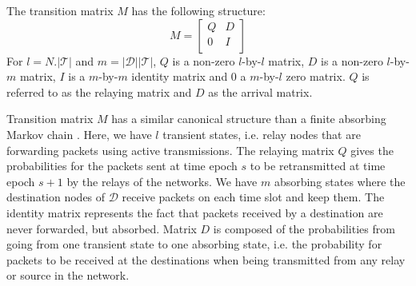 \documentclass[a4paper]{article}
\newcommand{\T}{\mathcal{T}}
\newcommand{\D}{\mathcal{D}}
\newcommand{\Mmatrix}{M}
\newcommand{\Qmatrix}{Q}
\newcommand{\Rmatrix}{D}
\begin{document}
The transition matrix $\Mmatrix$ has the following structure:
\[\Mmatrix = \left[ 
	\begin{array}{c|c}
	 \Qmatrix   	& \Rmatrix \\ \hline
  	 0 	& I \\
	\end{array}
\right]\] 
\noindent For $l=N.|\T|$ and $m=|\D||\T|$, $\Qmatrix$ is a non-zero $l$-by-$l$ matrix, $\Rmatrix$ is a non-zero $l$-by-$m$ matrix, $I$ is a $m$-by-$m$ identity matrix and $0$ a  $m$-by-$l$ zero matrix. $\Qmatrix$ is referred to as the relaying matrix and $\Rmatrix$ as the arrival matrix. 

Transition matrix $\Mmatrix$ has a similar canonical structure than a finite absorbing Markov chain \cite{markov}. Here, we have $l$ transient states, i.e. relay nodes that are forwarding packets using active transmissions. The relaying matrix $\Qmatrix$ gives the probabilities for the packets sent at time epoch $s$ to be retransmitted at time epoch $s+1$ by the relays of the networks. 
We have $m$ absorbing states where the destination nodes of $\D$ receive packets on each time slot and keep them. The identity matrix represents the fact that packets received by a destination are never forwarded, but absorbed.  Matrix $\Rmatrix$ is composed of the probabilities from going from one transient state to one absorbing state, i.e. the probability for packets to be received at the destinations when being transmitted from any relay or source in the network. 
\end{document}
